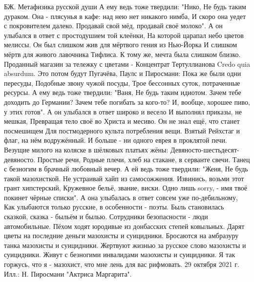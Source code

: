 БЖ. Метафизика русской души
А ему ведь тоже твердили: "Нико,
Не будь таким дураком.
Она - плясунья в кафе: над нею нет никакого нимба,
И скоро она уедет с покровителем далеко.
Продавай свой мёд, продавай своё молоко".
А он улыбался в ответ с простодушием той клеёнки,
На которой царапал небо цветов мелиссы.
Он был слишком жив для мёртвого гения из Нью-Йорка
И слишком мёртв для живого лавочника Тифлиса.
К тому же, мечта была слишком близко.
Проданный магазин за тележку с цветами -
Концентрат Тертуллианова Credo quia absurdum.
Это потом будут Пугачёва, Паулс и Пиросмани:
Пока же были одни пересуды,
Подобные звону чужой посуды,
Трое бессонных суток, потраченные ресурсы.
А ему ведь тоже твердили: "Ваня,
Не будь таким идиотом.
Зачем тебе доходить до Германии?
Зачем тебе погибать за кого-то?
И, вообще, хорошее пиво, у этих готов".
А он улыбался в ответ широко и весело
И выполнял приказы, не мешкая,
Превращая тело своё во Христа и месиво.
Он не знал ещё, что станет посмешищем
Для постмодерного культа потребления вещи.
Взятый Рейхстаг и флаг, на нём водружённый.
И больше - ни одного еврея в проклятой печи.
Везущие милого на коляске в шёлковых платьях жёны:
Девяносто-шестьдесят-девяносто. Простые речи,
Родные плечи, хлеб на стакане, в серванте свечи.
Танец с безногим в брачный любовный вечер.
А ей ведь тоже твердили: "Женя,
Не будь такой мазохисткой.
Не устраивай хайп из самосожжения.
Извинись, возьми этот грант хипстерский,
Кружевное бельё, звание, виски.
Одно лишь sorry, - имя твоё покинет чёрные списки".
А она улыбалась в ответ совсем уже по-дебильному,
Как улыбаются только русские, в особенности - поэты.
Быль становилась сказкой, сказка - быльём и былью.
Сотрудники безопасности - люди автомобильные.
Пёхом ходят юродивые из донбасских степей ковыльных.
Дарят цветы на последние деньги мазохисты и суицидники.
Бросаются на амбразуру танка мазохисты и суицидники.
Жертвуют жизнью за русское слово мазохисты и суицидники.
Живут с безногими инвалидами мазохисты и суицидники.
Я так горжусь, что я - мазохист, что мне лень для вас рифмовать.
29 октября 2021 г.
Илл.: Н. Пиросмани "Актриса Маргарита".
